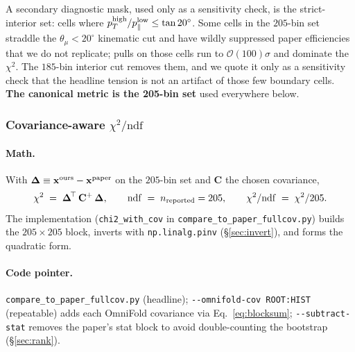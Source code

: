 A secondary diagnostic mask, used only as a sensitivity check, is the
strict-interior set: cells where $p_{T}^{\text{high}} / p_{\parallel}^{\text{low}}
\le \tan 20^{\circ}$. Some cells in the $205$-bin set straddle the
$\theta_{\mu}<20^{\circ}$ kinematic cut and have wildly suppressed
paper efficiencies that we do not replicate; pulls on those cells run
to $\mathcal{O}(100)\sigma$ and dominate the $\chi^{2}$. The $185$-bin
interior cut removes them, and we quote it only as a sensitivity check that
the headline tension is not an artifact of those few boundary cells.
\textbf{The canonical metric is the 205-bin set} used everywhere below.

\subsubsection{Covariance-aware $\chi^{2}/\mathrm{ndf}$}
\label{sec:chisq}

\paragraph{Math.}
With $\boldsymbol{\Delta}\equiv\mathbf{x}^{\text{ours}}-\mathbf{x}^{\text{paper}}$
on the $205$-bin set and $\mathbf{C}$ the chosen covariance,
\begin{equation}
\label{eq:chi2}
\chi^{2}
\;=\;
\boldsymbol{\Delta}^{\!\top}\,\mathbf{C}^{+}\,\boldsymbol{\Delta},
\qquad
\mathrm{ndf} \;=\; n_{\text{reported}} = 205,
\qquad
\chi^{2}/\mathrm{ndf} \;=\; \chi^{2}/205.
\end{equation}
The implementation (\texttt{chi2\_with\_cov} in
\texttt{compare\_to\_paper\_fullcov.py}) builds the $205\times205$
block, inverts with \texttt{np.linalg.pinv} (\S\ref{sec:invert}), and
forms the quadratic form.

\paragraph{Code pointer.}
\texttt{compare\_to\_paper\_fullcov.py} (headline);
\texttt{-{}-omnifold-cov ROOT:HIST} (repeatable) adds each OmniFold
covariance via Eq.~\eqref{eq:blocksum}; \texttt{-{}-subtract-stat}
removes the paper's stat block to avoid double-counting the bootstrap
(\S\ref{sec:rank}).

